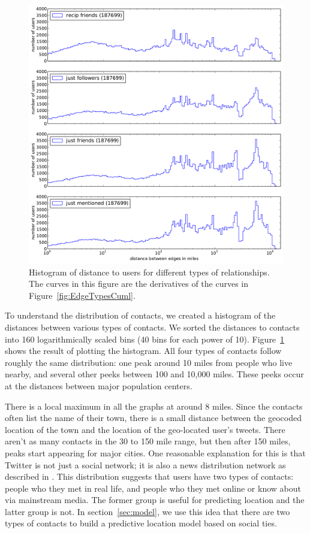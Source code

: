 \begin{figure}[tb]
\centering
\includegraphics[width=\linewidth]{figures/edge_types_norm.pdf}
\caption{
Histogram of distance to users for different types of relationships.
The curves in this figure are the derivatives of the curves in
Figure~\ref{fig:EdgeTypesCuml}.
}
\label{fig:EdgeTypes}
\end{figure}

To understand the distribution of contacts, we created a histogram of the distances between various types of contacts.
We sorted the distances to contacts into 160 logarithmically
scaled bins (40 bins for each power of 10).
%
Figure~\ref{fig:EdgeTypes} shows the result of plotting the histogram.
%
All four types of contacts follow roughly the same
distribution: one peak around 10 miles from people who live nearby, and several
other peeks between 100 and 10,000 miles.
%
These peeks occur at the distances between major population centers.

There is a local maximum in all the graphs at around 8 miles.
%
Since the contacts often list the name of their town, there is a small distance
between the geocoded location of the town and the location of the geo-located
user's tweets.
%
There aren't as many contacts in the 30 to 150 mile range, but then after 150
miles, peaks start appearing for major cities.
%
One reasonable explanation for this is that Twitter is not just a social
network; it is also a news distribution network as described in
\cite{kwak2010why}.
This distribution suggests that users have two types of contacts: people who
they met in real life, and people who they met online or know about via
mainstream media.
%
The former group is useful for predicting location and the latter group is not.
%
In section~\ref{sec:model}, we use this idea that there are two types of
contacts to build a predictive location model based on social ties.


